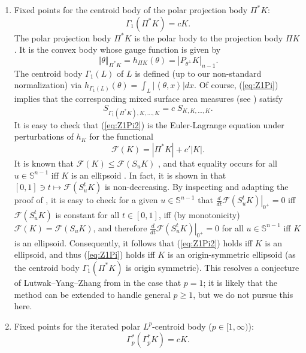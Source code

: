 \documentclass[11pt]{article}
\theoremstyle{definition}
\theoremstyle{proof}
\newcommand{\dt}[1]{\left . \frac{d}{dt} #1 \right |_{0^+}}
\DeclareMathOperator{\+}{\mathop{\tilde{+}}}
\newcommand{\norm}[1]{\left\Vert#1\right\Vert}
\newcommand{\abs}[1]{\left\vert#1\right\vert}
\newcommand{\scalar}[1]{\left \langle #1 \right \rangle}
\renewcommand{\S}{\mathbb{S}}
\newcommand{\F}{\mathcal{F}}
\numberwithin{equation}{section}
\numberwithin{equation}{section}
\begin{document}
\begin{enumerate}
\item Fixed points for the centroid body of the polar projection body $\Pi^* K$: 
\begin{equation} \label{eq:Z1Pi}
\Gamma_1(\Pi^*K) = c K .
\end{equation}
The polar projection body $\Pi^* K$ is the polar body to the projection body $\Pi K$. It is the convex body whose gauge function is given by
\[
 \norm{\theta}_{\Pi^* K} = h_{\Pi K}(\theta) = |P_{\theta^{\perp}} K|_{n-1}.
 \]
 The centroid body $\Gamma_1(L)$ of $L$ is defined (up to our non-standard normalization) via $h_{\Gamma_1(L)}(\theta) = \int_L \abs{\scalar{\theta,x}} dx$. Of course, (\ref{eq:Z1Pi}) implies that the corresponding mixed surface area measures (see \cite{Lutwak-MixedProjectionInqs}) satisfy
\begin{equation} \label{eq:Z1Pi2}
S_{\Gamma_1(\Pi^* K),K,\ldots,K} = c \; S_{K,K,\ldots,K} . 
\end{equation}
It is easy to check that (\ref{eq:Z1Pi2}) is the Euler-Lagrange equation under perturbations of $h_K$ for the functional
\[
\F(K) =  |\Pi^* K| + c' |K| . 
\]
It is known that $\F(K) \leq \F(S_u K)$ \cite{LYZ-Lp-PettyProjection,LYZ-OrliczProjectionBodies}, and that equality occurs for all $u \in \S^{n-1}$ iff $K$ is an ellipsoid \cite[Theorem 1.4]{EMilmanYehudayoff-AffineQuermassintegrals}. In fact, it is shown in \cite[Theorem 3.10]{EMilmanYehudayoff-AffineQuermassintegrals} that $[0,1] \ni t \mapsto \F(S_u^t K)$ is non-decreasing. By inspecting and adapting the proof of \cite[Theorem 4.6]{EMilmanYehudayoff-AffineQuermassintegrals}, it is easy to check for a given $u \in \S^{n-1}$ that $\dt{\F(S_u^t K)} = 0$ iff $\F(S_u^t K)$ is constant for all $t \in [0,1]$, iff (by monotonicity) $\F(K) = \F(S_u K)$, and therefore $\dt{\F(S_u^t K)} = 0$ for all $u \in \S^{n-1}$ iff $K$ is an ellipsoid. 
 Consequently, it follows that (\ref{eq:Z1Pi2}) holds iff $K$ is an ellipsoid, and thus (\ref{eq:Z1Pi}) holds iff $K$ is an origin-symmetric ellipsoid (as the centroid body $\Gamma_1(\Pi^* K)$ is origin symmetric). This resolves a conjecture of Lutwak--Yang--Zhang from \cite[Section 7]{LYZ-Lp-PettyProjection} in the case that $p=1$; it is likely that the method can be extended to handle general $p \geq 1$, but we do not pursue this here. 
\item Fixed points for the iterated polar $L^p$-centroid body ($p \in [1,\infty)$):
\begin{equation} \label{eq:Zp*}
\Gamma_p^*(\Gamma_p^* K) = c K . 

\end{equation}
\end{enumerate}
\end{document}
